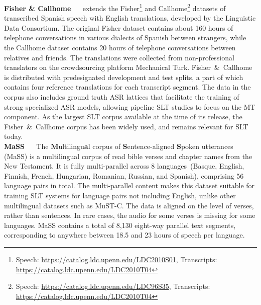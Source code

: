 \documentclass{svjour3}
\newcommand{\element}[1]{\noindent\textbf{#1} ~~}
\begin{document}
        \element{Fisher \& Callhome}
            \citet{post-improved-2013} extends the Fisher\footnote{Speech: \url{https://catalog.ldc.upenn.edu/LDC2010S01}, Transcripts: \url{https://catalog.ldc.upenn.edu/LDC2010T04}} and Callhome\footnote{Speech: \url{https://catalog.ldc.upenn.edu/LDC96S35}, Transcripts: \url{https://catalog.ldc.upenn.edu/LDC2010T04}} datasets of transcribed Spanish speech with English translations, developed by the Linguistic Data Consortium. The original Fisher dataset contains about 160 hours of telephone conversations in various dialects of Spanish between strangers, while the Callhome dataset contains 20 hours of telephone conversations between relatives and friends. The translations were collected from non-professional translators on the crowdsourcing platform Mechanical Turk. Fisher~\&~Callhome
is distributed with predesignated development and test splits, a part of which contains four reference translations for each transcript segment.
The data in the corpus also includes ground truth ASR lattices that facilitate the training of strong specialized ASR models, allowing pipeline SLT studies to focus on the MT component.
            As the largest SLT corpus available at the time of its release, the Fisher~\&~Callhome corpus has been widely used, and remains relevant for SLT today. \\ 

        


        \element{MaSS}
            The \textbf{M}ultilingu\textbf{a}l corpus of \textbf{S}entence-aligned \textbf{S}poken utterances (MaSS) \citep{boito-mass-2019} is a multilingual corpus of read bible verses and chapter names from the New Testament.
            It is fully multi-parallel across 8 languages~(Basque, English, Finnish, French, Hungarian, Romanian, Russian, and Spanish), comprising 56 language pairs in total.
            The multi-parallel content makes this dataset suitable for training SLT systems for language pairs not including English, unlike other multilingual datasets such as MuST-C.
            The data is aligned on the level of verses, rather than sentences. In rare cases, the audio for some verses is missing for some languages.
            MaSS contains a total of 8,130 eight-way parallel text segments, corresponding to anywhere between 18.5 and 23 hours of speech per language.
    
\end{document}
